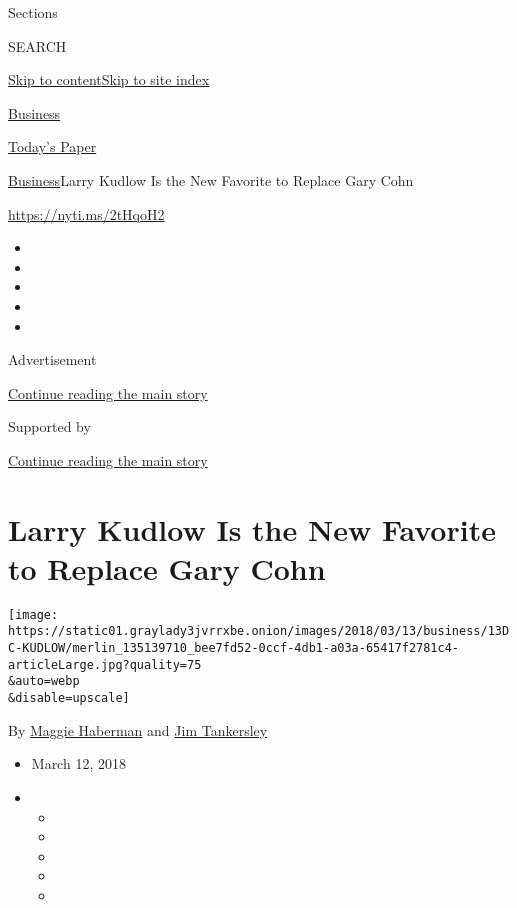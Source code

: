 Sections

SEARCH

\protect\hyperlink{site-content}{Skip to
content}\protect\hyperlink{site-index}{Skip to site index}

\href{https://www.nytimes3xbfgragh.onion/section/business}{Business}

\href{https://myaccount.nytimes3xbfgragh.onion/auth/login?response_type=cookie\&client_id=vi}{}

\href{https://www.nytimes3xbfgragh.onion/section/todayspaper}{Today's
Paper}

\href{/section/business}{Business}\textbar{}Larry Kudlow Is the New
Favorite to Replace Gary Cohn

\url{https://nyti.ms/2tHqoH2}

\begin{itemize}
\item
\item
\item
\item
\item
\end{itemize}

Advertisement

\protect\hyperlink{after-top}{Continue reading the main story}

Supported by

\protect\hyperlink{after-sponsor}{Continue reading the main story}

\hypertarget{larry-kudlow-is-the-new-favorite-to-replace-gary-cohn}{%
\section{Larry Kudlow Is the New Favorite to Replace Gary
Cohn}\label{larry-kudlow-is-the-new-favorite-to-replace-gary-cohn}}

\texttt{[image: https://static01.graylady3jvrrxbe.onion/images/2018/03/13/business/13DC-KUDLOW/merlin\_135139710\_bee7fd52-0ccf-4db1-a03a-65417f2781c4-articleLarge.jpg?quality=75\\\&auto=webp\\\&disable=upscale]}

By \href{https://www.nytimes3xbfgragh.onion/by/maggie-haberman}{Maggie
Haberman} and
\href{https://www.nytimes3xbfgragh.onion/by/jim-tankersley}{Jim
Tankersley}

\begin{itemize}
\item
  March 12, 2018
\item
  \begin{itemize}
  \item
  \item
  \item
  \item
  \item
  \end{itemize}
\end{itemize}

